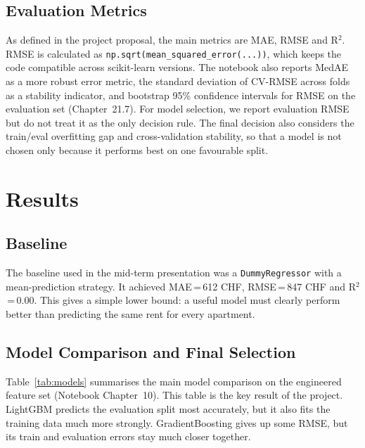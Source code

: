 \documentclass[11pt,a4paper]{article}
\begin{document}
\subsection{Evaluation Metrics}
As defined in the project proposal, the main metrics are MAE, RMSE and R$^2$. RMSE is calculated as \texttt{np.sqrt(mean\_squared\_error(...))}, which keeps the code compatible across scikit-learn versions. The notebook also reports MedAE as a more robust error metric, the standard deviation of CV-RMSE across folds as a stability indicator, and bootstrap 95\% confidence intervals for RMSE on the evaluation set (Chapter~21.7). For model selection, we report evaluation RMSE but do not treat it as the only decision rule. The final decision also considers the train/eval overfitting gap and cross-validation stability, so that a model is not chosen only because it performs best on one favourable split.

\section{Results}
\label{sec:results}

\subsection{Baseline}
The baseline used in the mid-term presentation was a \texttt{DummyRegressor} with a mean-prediction strategy. It achieved MAE\,=\,612 CHF, RMSE\,=\,847 CHF and R$^2$\,=\,0.00. This gives a simple lower bound: a useful model must clearly perform better than predicting the same rent for every apartment.

\subsection{Model Comparison and Final Selection}
Table~\ref{tab:models} summarises the main model comparison on the engineered feature set (Notebook Chapter~10). This table is the key result of the project. LightGBM predicts the evaluation split most accurately, but it also fits the training data much more strongly. GradientBoosting gives up some RMSE, but its train and evaluation errors stay much closer together.
\end{document}
